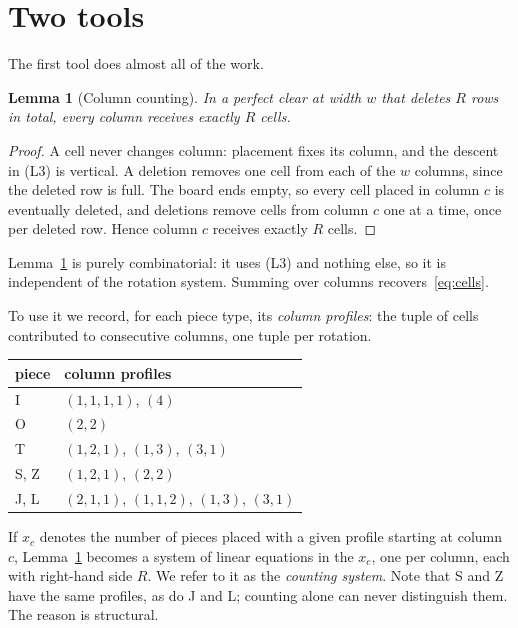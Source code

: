 \documentclass[11pt,a4paper]{article}
\theoremstyle{plain}
\newtheorem{lemma}[theorem]{Lemma}
\theoremstyle{definition}
\theoremstyle{remark}
\begin{document}
\section{Two tools}

The first tool does almost all of the work.

\begin{lemma}[Column counting]
\label{lem:count}
In a perfect clear at width $w$ that deletes $R$ rows in total, every column receives
exactly $R$ cells.
\end{lemma}

\begin{proof}
A cell never changes column: placement fixes its column, and the descent in (L3) is
vertical. A deletion removes one cell from each of the $w$ columns, since the deleted
row is full. The board ends empty, so every cell placed in column $c$ is eventually
deleted, and deletions remove cells from column $c$ one at a time, once per deleted
row. Hence column $c$ receives exactly $R$ cells.
\end{proof}

Lemma~\ref{lem:count} is purely combinatorial: it uses (L3) and nothing else, so it is
independent of the rotation system. Summing over columns recovers~\eqref{eq:cells}.

To use it we record, for each piece type, its \emph{column profiles}: the tuple of
cells contributed to consecutive columns, one tuple per rotation.

\begin{center}
\begin{tabular}{ll}
\toprule
piece & column profiles \\
\midrule
I & $(1,1,1,1)$, $(4)$ \\
O & $(2,2)$ \\
T & $(1,2,1)$, $(1,3)$, $(3,1)$ \\
S, Z & $(1,2,1)$, $(2,2)$ \\
J, L & $(2,1,1)$, $(1,1,2)$, $(1,3)$, $(3,1)$ \\
\bottomrule
\end{tabular}
\end{center}

If $x_c$ denotes the number of pieces placed with a given profile starting at column
$c$, Lemma~\ref{lem:count} becomes a system of linear equations in the $x_c$, one per
column, each with right-hand side $R$. We refer to it as the \emph{counting system}.
Note that S and Z have the same profiles, as do J and L; counting alone can never
distinguish them. The reason is structural.
\end{document}
